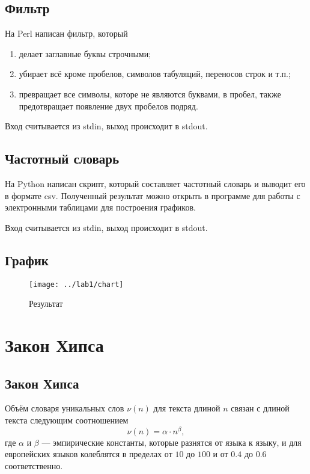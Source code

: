 \section{Фильтр}
На Perl написан фильтр, который
\begin{enumerate}
  \item делает заглавные буквы строчными;
  \item убирает всё кроме пробелов, символов табуляций, переносов строк и т.п.;
  \item превращает все символы, которе не являются буквами, в пробел, также
    предотвращает появление двух пробелов подряд.
\end{enumerate}

Вход считывается из stdin, выход происходит в stdout.

\lstset{inputencoding=utf8, extendedchars=\true}


\section{Частотный словарь}
На Python написан скрипт, который составляет частотный словарь
и выводит его в формате csv.
Полученный результат можно открыть в программе для работы
с электронными таблицами для построения графиков.

Вход считывается из stdin, выход происходит в stdout.

\lstset{inputencoding=utf8, extendedchars=\true}


\section{График}
\begin{figure}[h]
  \centering
  \texttt{[image: ../lab1/chart]}
  \caption{Результат}
\end{figure}

\chapter{Закон Хипса}

\section{Закон Хипса}
Объём словаря уникальных слов $\nu\left( n \right)$
для текста длиной $n$ связан с длиной текста следующим соотношением
\begin{equation*}
  \nu\left( n \right) = \alpha \cdot n^\beta,
\end{equation*}
где $\alpha$ и $\beta$ --- эмпирические константы,
которые разнятся от языка к языку,
и для европейских языков колеблятся в пределах
от $10$ до $100$ и от $0.4$ до $0.6$ соответственно.

